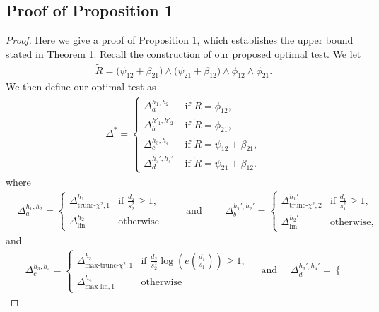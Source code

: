 \documentclass{article}
\newcommand{\lin}{\text{lin}}
\newcommand{\chisqlin}{\text{trunc-$\chi^2$}}
\newcommand{\chisqmax}{\text{max-trunc-$\chi^2$}}
\newcommand{\linmax}{\text{max-lin}}
\theoremstyle{remark}
\begin{document}
\subsection{Proof of Proposition 1}
\begin{proof}
    
Here we give a proof of Proposition 1, which establishes the upper bound stated in Theorem 1. Recall the construction of our proposed optimal test. We let 
\begin{align*}
    \tilde R = \big(\psi_{12} + \beta_{21}\big) \land \big(\psi_{21} + \beta_{12}\big) \land \phi_{12} \land \phi_{21}.
\end{align*}
We then define our optimal test as
\begin{align*}
    \Delta^* = \begin{cases}
        \Delta_a^{h_1, h_2} & \text{ if } \tilde R = \phi_{12}, \\
        \Delta_b^{h'_1, h'_2} & \text{ if } \tilde R = \phi_{21}, \\
        \Delta_c^{h_3, h_4} & \text{ if } \tilde R = \psi_{12} + \beta_{21},\\
        \Delta_d^{h_3', h_4'} & \text{ if } \tilde R = \psi_{21} + \beta_{12}.
    \end{cases}
\end{align*}
where
\begin{align*}
    &\Delta_a^{h_1,h_2} = \begin{cases}
        \Delta^{h_1}_{\chisqlin, 1} & \text{if  $\frac{d_2}{s_2^2} \geq 1$,} \\ \Delta^{h_2}_{\lin} & \text{otherwise}
    \end{cases} \qquad \text{ and } 
    \qquad \Delta_b^{h_1',h_2'} = \begin{cases}
        \Delta^{h_1'}_{\chisqlin, 2} & \text{if  $\frac{d_1}{s_1^2} \geq 1$,} \\ \Delta^{h_2'}_{\lin} & \text{otherwise,}
    \end{cases}
\end{align*}
and 
\begin{align*}
    &\Delta_c^{h_3,h_4} = \begin{cases}
        \Delta^{h_3}_{\chisqmax, 1} & \text{if  $\frac{d_2}{s_2^2}\log\!\left(e{d_1 \choose s_1}\right) \geq 1$,} \\ \Delta^{h_4}_{\linmax, 1} & \text{otherwise}
    \end{cases} \quad \text{ and } 
    \quad \Delta_d^{h_3',h_4'} = \begin{cases}

\end{cases}
\end{align*}
\end{proof}
\end{document}

